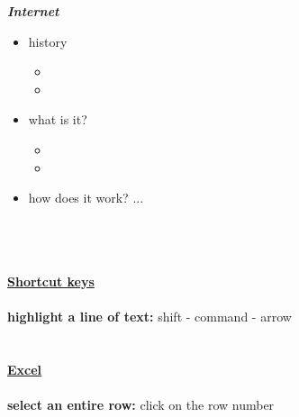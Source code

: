 \documentclass[11pt]{article}
\begin{document}
\emph{\bf Internet}

\begin{itemize}
\item history 
\begin{itemize}
\item
\item
\end{itemize}

\item what is it?
\begin{itemize}
\item
\item
\end{itemize}
\item how does it work? ...

\end{itemize}
\\
\\
\\
\underline{\bf Shortcut keys} \\
\\
{\bf highlight a line of text:}
shift - command - arrow
\\
\\
\\
\underline{\bf Excel}\\
\\
{\bf select an entire row:}
click on the row number
\end{document}
